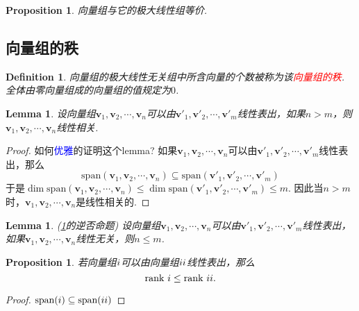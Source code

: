 \documentclass{article}
\newtheorem{lemma}[theorem]{Lemma}
\newtheorem{proposition}[theorem]{Proposition}
\newtheorem{definition}[theorem]{Definition}
\newcommand{\mbf}[1]{\bm{#1}}
\newcommand{\redt}[1]{\textcolor{red}{#1}}
\newcommand{\bluet}[1]{\textcolor{blue}{#1}}
\begin{document}
\begin{proposition}
\rm 向量组与它的极大线性组等价. 
\end{proposition}



\subsection{向量组的秩} 

\begin{definition}
\rm 向量组的极大线性无关组中所含向量的个数被称为该\redt{向量组的秩}. 全体由零向量组成的向量组的值规定为$0$.
\end{definition}

\begin{lemma}\label{vectors-rank: lemma1}
\rm 设向量组$\mbf{v}_1,\mbf{v}_2,\cdots,\mbf{v}_n$可以由$\mbf{v}'_1,\mbf{v}'_2,\cdots,\mbf{v}'_m$线性表出，如果$n > m$，则$\mbf{v}_1,\mbf{v}_2,\cdots,\mbf{v}_n$线性相关.
\end{lemma}

\begin{proof}
如何\bluet{优雅}的证明这个lemma? 如果$\mbf{v}_1,\mbf{v}_2,\cdots,\mbf{v}_n$可以由$\mbf{v}'_1,\mbf{v}'_2,\cdots,\mbf{v}'_m$线性表出，那么
$$
\text{span}(\mbf{v}_1,\mbf{v}_2,\cdots,\mbf{v}_n) \subseteq \text{span}(\mbf{v}'_1,\mbf{v}'_2,\cdots,\mbf{v}'_m)
$$
于是$\dim \text{span}(\mbf{v}_1,\mbf{v}_2,\cdots,\mbf{v}_n) \leq \dim \text{span}(\mbf{v}'_1,\mbf{v}'_2,\cdots,\mbf{v}'_m) \leq m$. 因此当$n > m$时，$\mbf{v}_1,\mbf{v}_2,\cdots,\mbf{v}_n$是线性相关的.
\end{proof}

\begin{lemma}
\rm (\ref{vectors-rank: lemma1}的逆否命题) 设向量组$\mbf{v}_1,\mbf{v}_2,\cdots,\mbf{v}_n$可以由$\mbf{v}'_1,\mbf{v}'_2,\cdots,\mbf{v}'_m$线性表出，如果$\mbf{v}_1,\mbf{v}_2,\cdots,\mbf{v}_n$线性无关，则$n \leq m$.
\end{lemma}

\begin{proposition}
\rm 若向量组$\uppercase\expandafter{\romannumeral1}$可以由向量组$\uppercase\expandafter{\romannumeral2}$线性表出，那么
$$
\text{rank}~\uppercase\expandafter{\romannumeral1} \leq \text{rank}~\uppercase\expandafter{\romannumeral2}. 
$$
\end{proposition}

\begin{proof}
$\text{span}(\uppercase\expandafter{\romannumeral1}) \subseteq \text{span}(\uppercase\expandafter{\romannumeral2})$
\end{proof}
\end{document}
